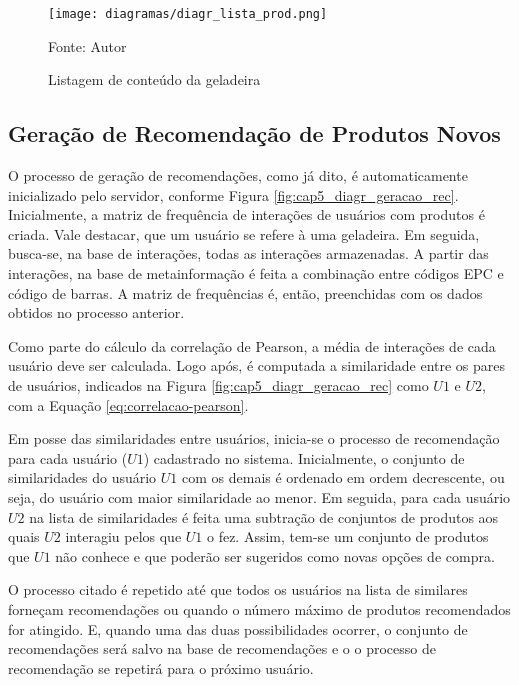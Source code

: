 \begin{figure}[htb]
    \caption{Listagem de conteúdo da geladeira}
    \label{fig:cap5_diagr_lista_prod}
    \texttt{[image: diagramas/diagr\_lista\_prod.png]}
    
    \footnotesize{Fonte: Autor}
\end{figure}

\subsection{Geração de Recomendação de Produtos Novos}

O processo de geração de recomendações, como já dito, é automaticamente inicializado pelo servidor, conforme Figura \ref{fig:cap5_diagr_geracao_rec}. Inicialmente, a matriz de frequência de interações de usuários com produtos é criada. Vale destacar, que um usuário se refere à uma geladeira. Em seguida, busca-se, na base de interações, todas as interações armazenadas. A partir das interações, na base de metainformação é feita a combinação entre códigos EPC e código de barras. A matriz de frequências é, então, preenchidas com os dados obtidos no processo anterior.

Como parte do cálculo da correlação de Pearson, a média de interações de cada usuário deve ser calculada. Logo após, é computada a similaridade entre os pares de usuários, indicados na Figura \ref{fig:cap5_diagr_geracao_rec} como $U1$ e $U2$, com a Equação \ref{eq:correlacao-pearson}.

Em posse das similaridades entre usuários, inicia-se o processo de recomendação para cada usuário ($U1$) cadastrado no sistema. Inicialmente, o conjunto de similaridades do usuário $U1$ com os demais é ordenado em ordem decrescente, ou seja, do usuário com maior similaridade ao menor. Em seguida, para cada usuário $U2$ na lista de similaridades é feita uma subtração de conjuntos de produtos aos quais $U2$ interagiu pelos que $U1$ o fez. Assim, tem-se um conjunto de produtos que $U1$ não conhece e que poderão ser sugeridos como novas opções de compra. 

O processo citado é repetido até que todos os usuários na lista de similares forneçam recomendações ou quando o número máximo de produtos recomendados for atingido. E, quando uma das duas possibilidades ocorrer, o conjunto de recomendações será salvo na base de recomendações e o o processo de recomendação se repetirá para o próximo usuário.

